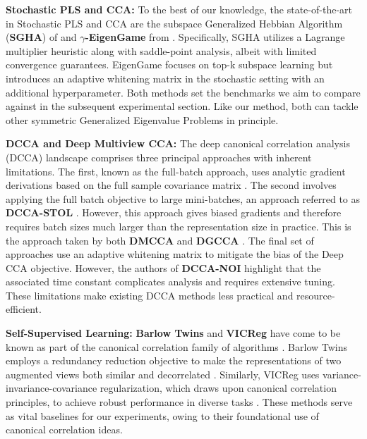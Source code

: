 \textbf{Stochastic PLS and CCA:}
To the best of our knowledge, the state-of-the-art in Stochastic PLS and CCA are the subspace Generalized Hebbian Algorithm (\textbf{SGHA}) of \cite{chen2019constrained} and \textbf{$\gamma$-EigenGame} from \cite{gemp20,gemp2021}. Specifically, SGHA utilizes a Lagrange multiplier heuristic along with saddle-point analysis, albeit with limited convergence guarantees. EigenGame focuses on top-k subspace learning but introduces an adaptive whitening matrix in the stochastic setting with an additional hyperparameter. Both methods set the benchmarks we aim to compare against in the subsequent experimental section. Like our method, both can tackle other symmetric Generalized Eigenvalue Problems in principle.

\textbf{DCCA and Deep Multiview CCA:}
The deep canonical correlation analysis (DCCA) landscape comprises three principal approaches with inherent limitations. The first, known as the full-batch approach, uses analytic gradient derivations based on the full sample covariance matrix \citep{andrew2013deep}.
The second involves applying the full batch objective to large mini-batches, an approach referred to as \textbf{DCCA-STOL} \citep{wang2015unsupervised}. However, this approach gives biased gradients and therefore requires batch sizes much larger than the representation size in practice. This is the approach taken by both \textbf{DMCCA} \citep{somandepalli2019multimodal} and \textbf{DGCCA} \citep{benton2017deep} . The final set of approaches use an adaptive whitening matrix \citep{wang2015stochastic, chang2018scalable} to mitigate the bias of the Deep CCA objective. However, the authors of \textbf{DCCA-NOI} highlight that the associated time constant complicates analysis and requires extensive tuning. These limitations make existing DCCA methods less practical and resource-efficient.


\textbf{Self-Supervised Learning:}
\textbf{Barlow Twins} and \textbf{VICReg} have come to be known as part of the canonical correlation family of algorithms \citep{balestriero2023cookbook}. Barlow Twins employs a redundancy reduction objective to make the representations of two augmented views both similar and decorrelated \citep{zbontar2021barlow}. Similarly, VICReg uses variance-invariance-covariance regularization, which draws upon canonical correlation principles, to achieve robust performance in diverse tasks \citep{bardes2021vicreg}. These methods serve as vital baselines for our experiments, owing to their foundational use of canonical correlation ideas.


